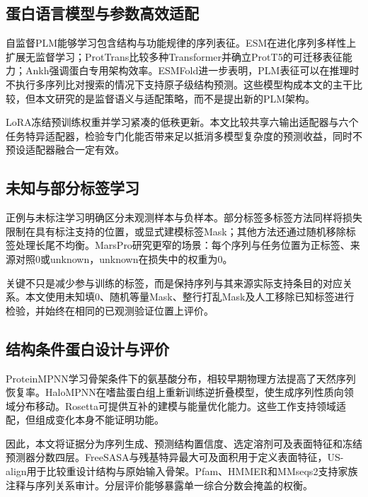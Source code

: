 \documentclass[conference]{IEEEtran}
\begin{document}
\subsection{蛋白语言模型与参数高效适配}

自监督PLM能够学习包含结构与功能规律的序列表征。ESM在进化序列多样性上扩展无监督学习\cite{ref16}；ProtTrans比较多种Transformer并确立ProtT5的可迁移表征能力\cite{ref2}；Ankh强调蛋白专用架构效率\cite{ref17}。ESMFold进一步表明，PLM表征可以在推理时不执行多序列比对搜索的情况下支持原子级结构预测\cite{ref3}。这些模型构成本文的主干比较，但本文研究的是监督语义与适配策略，而不是提出新的PLM架构。

LoRA冻结预训练权重并学习紧凑的低秩更新\cite{ref4}。本文比较共享六输出适配器与六个任务特异适配器，检验专门化能否带来足以抵消多模型复杂度的预测收益，同时不预设适配器融合一定有效。

\subsection{未知与部分标签学习}

正例与未标注学习明确区分未观测样本与负样本\cite{ref25}。部分标签多标签方法同样将损失限制在具有标注支持的位置，或显式建模标签Mask\cite{ref7}；其他方法还通过随机移除标签处理长尾不均衡\cite{ref26}。MarsPro研究更窄的场景：每个序列与任务位置为正标签、来源对照0或unknown，unknown在损失中的权重为0。

关键不只是减少参与训练的标签，而是保持序列与其来源实际支持条目的对应关系。本文使用未知填0、随机等量Mask、整行打乱Mask及人工移除已知标签进行检验，并始终在相同的已观测验证位置上评价。

\subsection{结构条件蛋白设计与评价}

ProteinMPNN学习骨架条件下的氨基酸分布，相较早期物理方法提高了天然序列恢复率\cite{ref5}。HaloMPNN在嗜盐蛋白组上重新训练逆折叠模型，使生成序列性质向领域分布移动\cite{ref6}。Rosetta可提供互补的建模与能量优化能力\cite{ref27}。这些工作支持领域适配，但组成变化本身不能证明功能。

因此，本文将证据分为序列生成、预测结构置信度、选定溶剂可及表面特征和冻结预测器分数四层。FreeSASA与残基特异最大可及面积用于定义表面特征\cite{ref9,ref10}，US-align用于比较重设计结构与原始输入骨架\cite{ref11}。Pfam、HMMER和MMseqs2支持家族注释与序列关系审计\cite{ref28,ref29,ref30}。分层评价能够暴露单一综合分数会掩盖的权衡。

\FloatBarrier
\end{document}
